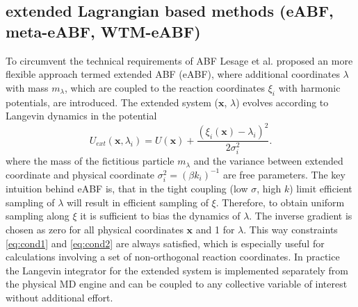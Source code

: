 \newpage
\subsection{extended Lagrangian based methods (eABF, meta-eABF, WTM-eABF)}
\label{sec:eABF}
To circumvent the technical requirements of ABF Lesage et al.\autocite{lesage2017smoothed} proposed an more flexible approach termed extended ABF (eABF), where additional coordinates $\lambda$ with mass $m_{\lambda}$, which are coupled to the reaction coordinates $\xi_i$ with harmonic potentials, are introduced. The extended system ($\textbf{x}$, $\lambda$) evolves according to Langevin dynamics in the potential
\begin{equation}
  U_{ext}(\textbf{x},\lambda_i) = U(\textbf{x}) + \frac{(\xi_{i}(\textbf{x})-\lambda_i)^2}{2\sigma_i^2}.
\end{equation}
where the mass of the fictitious particle $m_\lambda$ and the variance between extended coordinate and physical coordinate $\sigma_i^2=(\beta k_i)^{-1}$ are free parameters.
The key intuition behind eABF is, that in the tight coupling (low $\sigma$, high $k$) limit efficient sampling of $\lambda$ will result in efficient sampling of $\xi$.
Therefore, to obtain uniform sampling along $\xi$ it is sufficient to bias the dynamics of $\lambda$. The inverse gradient is chosen as zero for all physical coordinates $\textbf{x}$ and 1 for $\lambda$.
This way constraints \ref{eq:cond1} and \ref{eq:cond2} are always satisfied, which is especially useful for calculations involving a set of non-orthogonal reaction coordinates.
In practice the Langevin integrator for the extended system is implemented separately from the physical MD engine and can be coupled to any collective variable of interest without additional effort.

